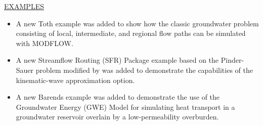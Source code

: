 \begin{itemize}
	\end{itemize}

	\underline{EXAMPLES}
	\begin{itemize}
		\item A new Toth example was added to show how the classic groundwater problem consisting of local, intermediate, and regional flow paths can be simulated with MODFLOW.
		\item A new Streamflow Routing (SFR) Package example based on the Pinder-Sauer problem \citep{pinder1971numerical} modified by \cite{lal2001modification} was added to demonstrate the capabilities of the kinematic-wave approximation option.
		\item A new Barends example was added to demonstrate the use of the Groundwater Energy (GWE) Model for simulating heat transport in a groundwater reservoir overlain by a low-permeability overburden.
	\end{itemize}

